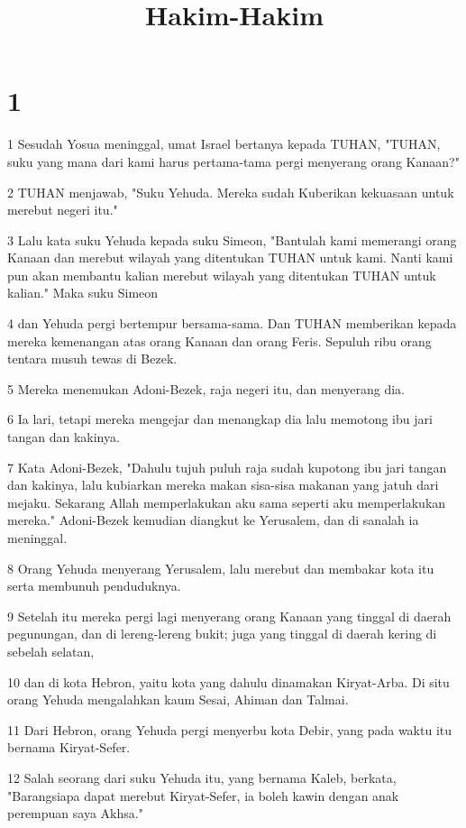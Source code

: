

\title{Hakim-Hakim}


\chapter{1}

\par 1 Sesudah Yosua meninggal, umat Israel bertanya kepada TUHAN, "TUHAN, suku yang mana dari kami harus pertama-tama pergi menyerang orang Kanaan?"
\par 2 TUHAN menjawab, "Suku Yehuda. Mereka sudah Kuberikan kekuasaan untuk merebut negeri itu."
\par 3 Lalu kata suku Yehuda kepada suku Simeon, "Bantulah kami memerangi orang Kanaan dan merebut wilayah yang ditentukan TUHAN untuk kami. Nanti kami pun akan membantu kalian merebut wilayah yang ditentukan TUHAN untuk kalian." Maka suku Simeon
\par 4 dan Yehuda pergi bertempur bersama-sama. Dan TUHAN memberikan kepada mereka kemenangan atas orang Kanaan dan orang Feris. Sepuluh ribu orang tentara musuh tewas di Bezek.
\par 5 Mereka menemukan Adoni-Bezek, raja negeri itu, dan menyerang dia.
\par 6 Ia lari, tetapi mereka mengejar dan menangkap dia lalu memotong ibu jari tangan dan kakinya.
\par 7 Kata Adoni-Bezek, "Dahulu tujuh puluh raja sudah kupotong ibu jari tangan dan kakinya, lalu kubiarkan mereka makan sisa-sisa makanan yang jatuh dari mejaku. Sekarang Allah memperlakukan aku sama seperti aku memperlakukan mereka." Adoni-Bezek kemudian diangkut ke Yerusalem, dan di sanalah ia meninggal.
\par 8 Orang Yehuda menyerang Yerusalem, lalu merebut dan membakar kota itu serta membunuh penduduknya.
\par 9 Setelah itu mereka pergi lagi menyerang orang Kanaan yang tinggal di daerah pegunungan, dan di lereng-lereng bukit; juga yang tinggal di daerah kering di sebelah selatan,
\par 10 dan di kota Hebron, yaitu kota yang dahulu dinamakan Kiryat-Arba. Di situ orang Yehuda mengalahkan kaum Sesai, Ahiman dan Talmai.
\par 11 Dari Hebron, orang Yehuda pergi menyerbu kota Debir, yang pada waktu itu bernama Kiryat-Sefer.
\par 12 Salah seorang dari suku Yehuda itu, yang bernama Kaleb, berkata, "Barangsiapa dapat merebut Kiryat-Sefer, ia boleh kawin dengan anak perempuan saya Akhsa."
